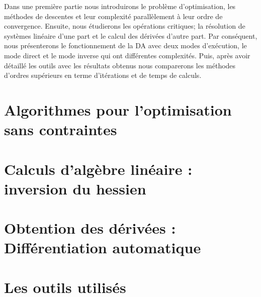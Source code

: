 \documentclass[caractereUtf,maitrise]{style/scienceUdeS}
\begin{document}
{Dans une premi\`ere partie nous introduirons le probl\`eme d'optimisation, les m\'ethodes de descentes et leur complexit\'e parall\`element \`a leur ordre de convergence.
Ensuite, nous \'etudierons les op\'erations critiques; la r\'esolution de syst\`emes lin\'eaire d'une part et le calcul des d\'eriv\'ees d'autre part. Par cons\'equent, 
nous pr\'esenterons le fonctionnement de la DA avec deux modes d'ex\'ecution, le mode direct et le mode inverse qui ont diff\'erentes complexit\'es. Puis,
apr\`es avoir d\'etaill\'e les outils avec les r\'esultats obtenus nous comparerons les m\'ethodes d'ordres sup\'erieurs en terme d'it\'erations et de temps de calculs.

}


\modeFrancais{}
\chapter[Algorithmes pour l'optimisation sans contraintes] 
        {\singlespacing%
         Algorithmes pour l'optimisation sans contraintes}
         \label{ch:chapitre-1}

\modeFrancais{}
\chapter[Calculs d'alg\`ebre lin\'eaire : inversion du hessien] 
        {\singlespacing%
         Calculs d'alg\`ebre lin\'eaire : inversion du hessien}
         \label{ch:chapitre-2}
% 

\modeFrancais{}
\chapter[Obtention des d\'eriv\'ees : Diff\'erentiation automatique] 
        {\singlespacing%
         Obtention des d\'eriv\'ees : Diff\'erentiation automatique}
         \label{ch:chapitre-3}


\modeFrancais{}
\chapter[Les outils utilis\'es] 
        {\singlespacing%
         Les outils utilis\'es}
         \label{ch:chapitre-4}
\end{document}
